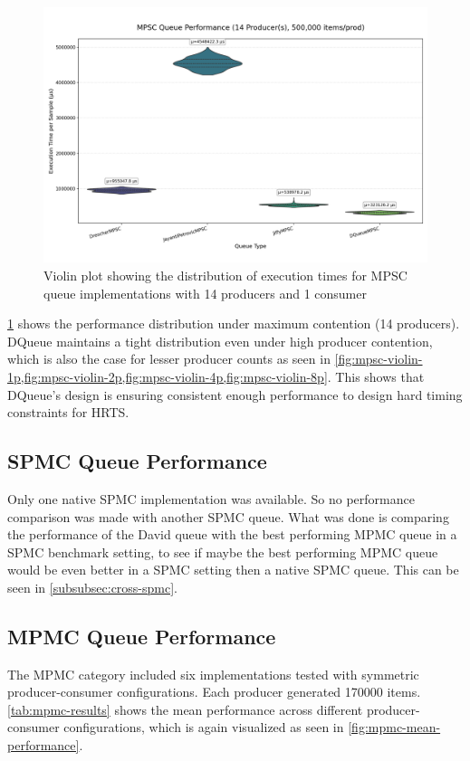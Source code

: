 \begin{figure}[htb]
\centering
\caption{Violin plot showing the distribution of execution times for MPSC queue implementations with 14 producers and 1 consumer}
\label{fig:mpsc-violin-14p}
\includegraphics[width=\textwidth]{images/results/mpsc_performance_violin_14_producers.png}
\end{figure}

\cref{fig:mpsc-violin-14p} shows the performance distribution under maximum contention (14 producers). DQueue maintains a tight distribution even under high producer contention, which is also the case for lesser producer counts as seen in \cref{fig:mpsc-violin-1p,fig:mpsc-violin-2p,fig:mpsc-violin-4p,fig:mpsc-violin-8p}. This shows that DQueue's design is ensuring consistent enough performance to design hard timing constraints for \ac{HRTS}.

\subsection{\acf{SPMC} Queue Performance}
Only one native \ac{SPMC} implementation was available. So no performance comparison was made with another \ac{SPMC} queue. What was done is comparing the performance of the David queue with the best performing \ac{MPMC} queue in a \ac{SPMC} benchmark setting, to see if maybe the best performing \ac{MPMC} queue would be even better in a \ac{SPMC} setting then a native \ac{SPMC} queue. This can be seen in \cref{subsubsec:cross-spmc}.

\subsection{\acf{MPMC} Queue Performance}
The \ac{MPMC} category included six implementations tested with symmetric producer-consumer configurations. Each producer generated 170000 items. \cref{tab:mpmc-results} shows the mean performance across different producer-consumer configurations, which is again visualized as seen in \cref{fig:mpmc-mean-performance}.


